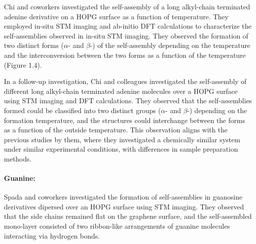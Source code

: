 Chi and coworkers investigated the self-assembly of a long alkyl-chain terminated adenine derivative on a HOPG surface as a function of temperature.\supercite{mu_temperature-dependent_2013} They employed in-situ STM imaging and ab-initio DFT calculations to characterize the self-assemblies observed in in-situ STM imaging. They observed the formation of two distinct forms ($\alpha$- and $\beta$-) of the self-assembly depending on the temperature and the interconversion between the two forms as a function of the temperature (Figure 1.4).

In a follow-up investigation, Chi and colleagues investigated the self-assembly of different long alkyl-chain terminated adenine molecules over a HOPG surface using STM imaging and DFT calculations.\supercite{wang_controlling_2014} They observed that the self-assemblies formed could be classified into two distinct groups ($\alpha$- and $\beta$-) depending on the formation temperature, and the structures could interchange between the forms as a function of the outside temperature. This observation aligns with the previous studies by them, where they investigated a chemically similar system under similar experimental conditions, with differences in sample preparation methods.\supercite{mu_temperature-dependent_2013} 

\paragraph{Guanine:} Spada and coworkers investigated the formation of self-assemblies in guanosine derivatives dipersed over an HOPG surface using STM imaging\supercite{gottarelli_self-assembly_2000}. They observed that the side chains remained flat on the graphene surface, and the self-assembled mono-layer consisted of two ribbon-like arrangements of guanine molecules interacting via hydrogen bonds.

